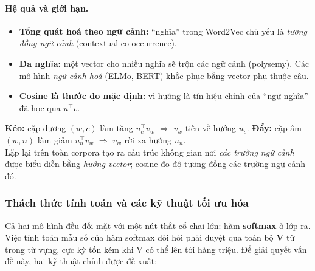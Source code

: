 \paragraph{Hệ quả và giới hạn.}
\begin{itemize}
    \item \textbf{Tổng quát hoá theo ngữ cảnh:} ``nghĩa'' trong Word2Vec chủ yếu là \emph{tương đồng ngữ cảnh} (contextual co-occurrence).
    \item \textbf{Đa nghĩa:} một vector cho nhiều nghĩa sẽ trộn các ngữ cảnh (polysemy). Các mô hình \emph{ngữ cảnh hoá} (ELMo, BERT) khắc phục bằng vector phụ thuộc câu.
    \item \textbf{Cosine là thước đo mặc định:} vì hướng là tín hiệu chính của ``ngữ nghĩa'' đã học qua $u^\top v$.
\end{itemize}

\begin{tcolorbox}[title=Trực giác ``kéo--đẩy'' trong SGNS, colback=blue!5!white, colframe=blue!60!black, fonttitle=\bfseries]
\textbf{Kéo:} cặp dương $(w,c)$ làm tăng $u_c^\top v_w$ $\Rightarrow$ $v_w$ tiến về hướng $u_c$. 
\quad
\textbf{Đẩy:} cặp âm $(w,n)$ làm giảm $u_n^\top v_w$ $\Rightarrow$ $v_w$ rời xa hướng $u_n$.
\\[3pt]
Lặp lại trên toàn corpora tạo ra cấu trúc không gian nơi \emph{các trường ngữ cảnh} được biểu diễn bằng \emph{hướng vector}; cosine đo độ tương đồng các trường ngữ cảnh đó.
\end{tcolorbox}

\subsubsection{Thách thức tính toán và các kỹ thuật tối ưu hóa}
Cả hai mô hình đều đối mặt với một nút thắt cổ chai lớn: hàm \textbf{softmax} ở lớp ra. Việc tính toán mẫu số của hàm softmax đòi hỏi phải duyệt qua toàn bộ \textbf{V} từ trong từ vựng, cực kỳ tốn kém khi V có thể lên tới hàng triệu. Để giải quyết vấn đề này, hai kỹ thuật chính được đề xuất:

